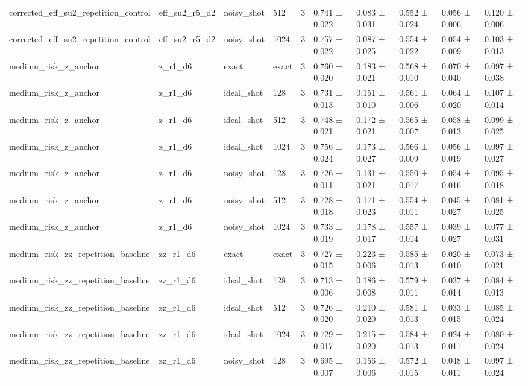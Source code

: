 \begin{table}[t]
\begin{tabular}{llllrlllll}
corrected\_eff\_su2\_repetition\_control & eff\_su2\_r5\_d2 & noisy\_shot & 512 & 3 & 0.741 ± 0.022 & 0.083 ± 0.031 & 0.552 ± 0.024 & 0.056 ± 0.006 & 0.120 ± 0.006 \\
corrected\_eff\_su2\_repetition\_control & eff\_su2\_r5\_d2 & noisy\_shot & 1024 & 3 & 0.757 ± 0.022 & 0.087 ± 0.025 & 0.554 ± 0.022 & 0.054 ± 0.009 & 0.103 ± 0.013 \\
medium\_risk\_z\_anchor & z\_r1\_d6 & exact & exact & 3 & 0.760 ± 0.020 & 0.183 ± 0.021 & 0.568 ± 0.010 & 0.070 ± 0.040 & 0.097 ± 0.038 \\
medium\_risk\_z\_anchor & z\_r1\_d6 & ideal\_shot & 128 & 3 & 0.731 ± 0.013 & 0.151 ± 0.010 & 0.561 ± 0.006 & 0.064 ± 0.020 & 0.107 ± 0.014 \\
medium\_risk\_z\_anchor & z\_r1\_d6 & ideal\_shot & 512 & 3 & 0.748 ± 0.021 & 0.172 ± 0.021 & 0.565 ± 0.007 & 0.058 ± 0.013 & 0.099 ± 0.025 \\
medium\_risk\_z\_anchor & z\_r1\_d6 & ideal\_shot & 1024 & 3 & 0.756 ± 0.024 & 0.173 ± 0.027 & 0.566 ± 0.009 & 0.056 ± 0.019 & 0.097 ± 0.027 \\
medium\_risk\_z\_anchor & z\_r1\_d6 & noisy\_shot & 128 & 3 & 0.726 ± 0.011 & 0.131 ± 0.021 & 0.550 ± 0.017 & 0.054 ± 0.016 & 0.095 ± 0.018 \\
medium\_risk\_z\_anchor & z\_r1\_d6 & noisy\_shot & 512 & 3 & 0.728 ± 0.018 & 0.171 ± 0.023 & 0.554 ± 0.011 & 0.045 ± 0.027 & 0.081 ± 0.025 \\
medium\_risk\_z\_anchor & z\_r1\_d6 & noisy\_shot & 1024 & 3 & 0.733 ± 0.019 & 0.178 ± 0.017 & 0.557 ± 0.014 & 0.039 ± 0.027 & 0.077 ± 0.031 \\
medium\_risk\_zz\_repetition\_baseline & zz\_r1\_d6 & exact & exact & 3 & 0.727 ± 0.015 & 0.223 ± 0.006 & 0.585 ± 0.013 & 0.020 ± 0.010 & 0.073 ± 0.021 \\
medium\_risk\_zz\_repetition\_baseline & zz\_r1\_d6 & ideal\_shot & 128 & 3 & 0.713 ± 0.006 & 0.186 ± 0.008 & 0.579 ± 0.011 & 0.037 ± 0.014 & 0.084 ± 0.013 \\
medium\_risk\_zz\_repetition\_baseline & zz\_r1\_d6 & ideal\_shot & 512 & 3 & 0.726 ± 0.020 & 0.210 ± 0.020 & 0.581 ± 0.013 & 0.033 ± 0.015 & 0.085 ± 0.024 \\
medium\_risk\_zz\_repetition\_baseline & zz\_r1\_d6 & ideal\_shot & 1024 & 3 & 0.729 ± 0.017 & 0.215 ± 0.020 & 0.584 ± 0.013 & 0.024 ± 0.011 & 0.080 ± 0.024 \\
medium\_risk\_zz\_repetition\_baseline & zz\_r1\_d6 & noisy\_shot & 128 & 3 & 0.695 ± 0.007 & 0.156 ± 0.006 & 0.572 ± 0.015 & 0.048 ± 0.011 & 0.097 ± 0.024 \\

\end{tabular}
\end{table}
